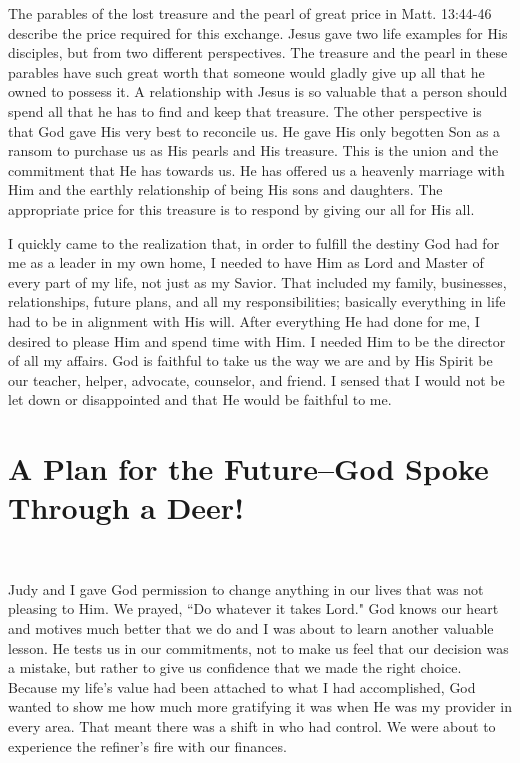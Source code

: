 \documentclass[oneside,12pt]{book}
\begin{document}
The parables of the lost treasure and the pearl of great price in Matt. 13:44-46 describe the price required for this exchange. Jesus gave two life examples for His disciples, but from two different perspectives. The treasure and the pearl in these parables have such great worth that someone would gladly give up all that he owned to possess it. A relationship with Jesus is so valuable that a person should spend all that he has to find and keep that treasure. The other perspective is that God gave His very best to reconcile us. He gave His only begotten Son as a ransom to purchase us as His pearls and His treasure. This is the union and the commitment that He has towards us. He has offered us a heavenly marriage with Him and the earthly relationship of being His sons and daughters. The appropriate price for this treasure is to respond by giving our all for His all.

I quickly came to the realization that, in order to fulfill the destiny God had for me as a leader in my own home, I needed to have Him as Lord and Master of every part of my life, not just as my Savior. That included my family, businesses, relationships, future plans, and all my responsibilities; basically everything in life had to be in alignment with His will. After everything He had done for me, I desired to please Him and spend time with Him. I needed Him to be the director of all my affairs. God is faithful to take us the way we are and by His Spirit be our teacher, helper, advocate, counselor, and friend. I sensed that I would not be let down or disappointed and that He would be faithful to me.


\chapter{A Plan for the Future--God Spoke Through a Deer!}
\

Judy and I gave God permission to change anything in our lives that was not pleasing to Him. We prayed, ``Do whatever it takes Lord." God knows our heart and motives much better that we do and I was about to learn another valuable lesson. He tests us in our commitments, not to make us feel that our decision was a mistake, but rather to give us confidence that we made the right choice. Because my life's value had been attached to what I had accomplished, God wanted to show me how much more gratifying it was when He was my provider in every area. That meant there was a shift in who had control. We were about to experience the refiner's fire with our finances.
\end{document}
